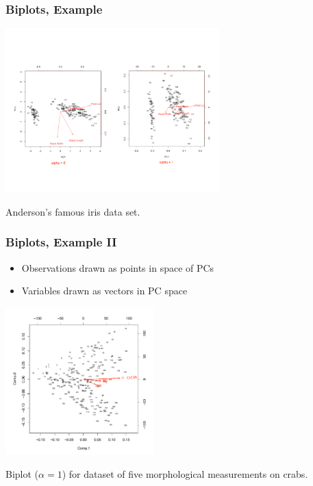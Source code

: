 \documentclass{beamer}
\begin{document}

\begin{frame}
  \frametitle{Biplots, Example}


\begin{center}
\includegraphics[height=2.5in]{iris-biplots2}

{\footnotesize Anderson's famous iris data set.}
\end{center}


\end{frame}



\begin{frame}
  \frametitle{Biplots, Example II}
\begin{itemize}
\item Observations drawn as points in space of PCs
\item Variables drawn as vectors in PC space
\end{itemize}

\begin{center}
\includegraphics[height=2.25in]{crab-biplot}

{\footnotesize Biplot ($\alpha=1$) for dataset of five morphological measurements on crabs.}
\end{center}


\end{frame}
\end{document}
